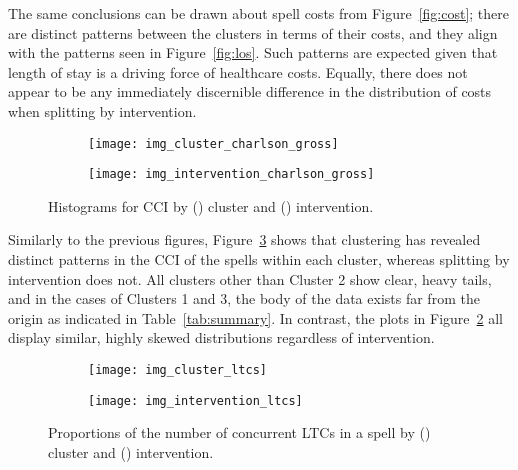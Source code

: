 The same conclusions can be drawn about spell costs from Figure~\ref{fig:cost};
there are distinct patterns between the clusters in terms of their costs, and
they align with the patterns seen in Figure~\ref{fig:los}. Such patterns are
expected given that length of stay is a driving force of healthcare costs.
Equally, there does not appear to be any immediately discernible difference in
the distribution of costs when splitting by intervention.

\begin{figure}
    \centering
    \begin{subfigure}{.5\imgwidth}
        \texttt{[image: img\_cluster\_charlson\_gross]}
        \caption{}\label{fig:cluster_charlson}
    \end{subfigure}\hfill%
    \begin{subfigure}{.5\imgwidth}
        \texttt{[image: img\_intervention\_charlson\_gross]}
        \caption{}\label{fig:intervention_charlson}
    \end{subfigure}
    \caption{%
        Histograms for CCI by () cluster and
        () intervention.
    }\label{fig:charlson}
\end{figure}

Similarly to the previous figures, Figure~\ref{fig:charlson} shows that
clustering has revealed distinct patterns in the CCI of the spells within each
cluster, whereas splitting by intervention does not. All clusters other than
Cluster 2 show clear, heavy tails, and in the cases of Clusters 1 and 3, the
body of the data exists far from the origin as indicated in
Table~\ref{tab:summary}. In contrast, the plots in
Figure~\ref{fig:intervention_charlson} all display similar, highly skewed
distributions regardless of intervention.

\begin{figure}
    \centering
    \begin{subfigure}{.5\imgwidth}
        \texttt{[image: img\_cluster\_ltcs]}
        \caption{}\label{fig:cluster_ltcs}
    \end{subfigure}\hfill%
    \begin{subfigure}{.5\imgwidth}
        \texttt{[image: img\_intervention\_ltcs]}
        \caption{}\label{fig:intervention_ltcs}
    \end{subfigure}
    \caption{%
        Proportions of the number of concurrent LTCs in a spell by
        () cluster and ()
        intervention.
    }\label{fig:ltcs}
\end{figure}

